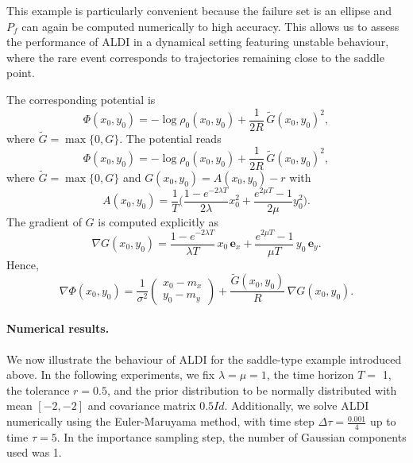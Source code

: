 \documentclass[a4paper]{article}
\numberwithin{equation}{section}
\begin{document}
This example is particularly convenient because the failure set is an ellipse
and $P_f$ can again be computed numerically to high accuracy.  This allows us to assess the performance of ALDI in a dynamical setting featuring unstable behaviour, where the rare event corresponds to trajectories remaining close to the saddle point.

The corresponding potential is
\begin{equation}
    \label{eq:potential_saddle}
    \Phi(x_0,y_0)
    =
    -\log \rho_0(x_0,y_0)
    +
    \frac{1}{2R}\,\tilde{G}(x_0,y_0)^2,
\end{equation}
where $\tilde G=\max\{0,G\}$.  
The potential reads
\begin{equation}\label{eq:Phi_saddle}
  \Phi(x_0,y_0)
  = -\log \rho_0(x_0,y_0)
    + \frac{1}{2R}\,\tilde G(x_0,y_0)^2,
\end{equation}
where $\tilde G=\max\{0,G\}$ and $G(x_0,y_0)=A(x_0,y_0)-r$ with
\begin{equation}\label{eq:A_saddle}
A(x_0,y_0)
= \frac{1}{T}\Bigg(
   \frac{1-e^{-2\lambda T}}{2\lambda}x_0^2
 + \frac{e^{2\mu T}-1}{2\mu}y_0^2
  \Bigg).
\end{equation}
The gradient of $G$ is computed explicitly as
\begin{equation}\label{eq:gradG_saddle}
\nabla G(x_0,y_0)
 = \frac{1-e^{-2\lambda T}}{\lambda T}\,x_0\,\mathbf e_x
 + \frac{e^{2\mu T}-1}{\mu T}\,y_0\,\mathbf e_y.
\end{equation}
Hence,
\begin{equation}\label{eq:gradPhi_saddle}
\nabla\Phi(x_0,y_0)
 = \frac{1}{\sigma^2}
   \begin{pmatrix}x_0-m_x\\ y_0-m_y\end{pmatrix}
 + \frac{\tilde G(x_0,y_0)}{R}\,
   \nabla G(x_0,y_0).
\end{equation}


\paragraph{Numerical results.}
We now illustrate the behaviour of ALDI for the saddle-type example introduced
above. In the following experiments, we fix $\lambda=\mu=1$, the time horizon $T=$ 1, the tolerance $r=0.5$, and the prior distribution to be normally distributed with mean $[-2,-2]$ and covariance matrix $0.5 Id$. Additionally, we solve ALDI numerically using the Euler-Maruyama method, with time step $\Delta \tau=\frac{0.001}{4}$ up to time $\tau=5$. In the importance sampling step, the number of Gaussian components used was 1.
\end{document}
